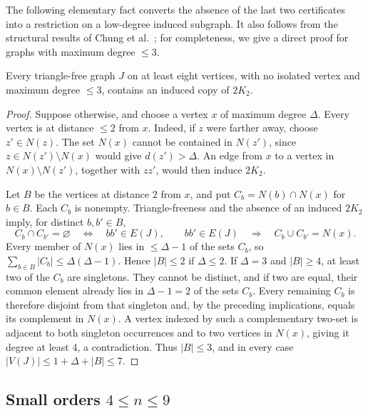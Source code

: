 The following elementary fact converts the absence of the last two
certificates into a restriction on a low-degree induced subgraph.  It also
follows from the structural results of Chung et
al.~\cite[Corollary to Theorem~1 and Theorem~2]{chung1990}; for completeness,
we give a direct proof for graphs with maximum degree \(\le3\).

\begin{lemma}
\label{lem:triangle-free-induced-matching}
Every triangle-free graph \(J\) on at least eight vertices, with no
isolated vertex and maximum degree \(\le3\), contains an induced
copy of \(2K_2\).
\end{lemma}

\begin{proof}
Suppose otherwise, and choose a vertex \(x\) of maximum degree
\(\Delta\).  Every vertex is at distance \(\le2\) from \(x\).
Indeed, if \(z\) were farther away, choose \(z'\in N(z)\).  The set
\(N(x)\) cannot be contained in \(N(z')\), since
\(z\in N(z')\setminus N(x)\) would give \(d(z')>\Delta\).  An edge
from \(x\) to a vertex in \(N(x)\setminus N(z')\), together with
\(zz'\), would then induce \(2K_2\).

Let \(B\) be the vertices at distance \(2\) from \(x\), and put
\(C_b=N(b)\cap N(x)\) for \(b\in B\).  Each \(C_b\) is nonempty.
Triangle-freeness and the absence of an induced \(2K_2\) imply, for
distinct \(b,b'\in B\),
\[
 C_b\cap C_{b'}=\varnothing\quad\Longleftrightarrow\quad bb'\in E(J),
 \qquad
 bb'\in E(J)\quad\Longrightarrow\quad C_b\cup C_{b'}=N(x).
\]
Every member of \(N(x)\) lies in \(\le\Delta-1\) of the sets
\(C_b\), so \(\sum_{b\in B}|C_b|\le\Delta(\Delta-1)\).  Hence
\(|B|\le2\) if \(\Delta\le2\).  If \(\Delta=3\) and \(|B|\ge4\),
at least two of the \(C_b\) are singletons.  They cannot be distinct,
and if two are equal, their common element already lies in
\(\Delta-1=2\) of the sets \(C_b\).  Every remaining \(C_b\) is therefore
disjoint from that singleton and, by the preceding implications, equals its
complement in \(N(x)\).  A vertex indexed by such a complementary
two-set is adjacent to both singleton occurrences and to two vertices in
\(N(x)\), giving it degree at least \(4\), a contradiction.  Thus
\(|B|\le3\), and in every case
\(|V(J)|\le1+\Delta+|B|\le7\).
\end{proof}

\subsection{Small orders \texorpdfstring{\(4\le n\le9\)}{4 <= n <= 9}}

